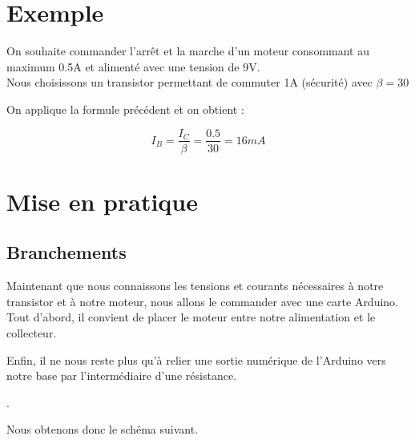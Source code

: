 \section{Exemple}

On souhaite commander l'arrêt et la marche d'un moteur consommant au maximum 0.5A et alimenté avec une tension de 9V. \\
Nous choisissons un transistor permettant de commuter 1A (sécurité) avec $\beta=30$ \\



\begin{reponse}
  On applique la formule précédent et on obtient : 

  $$  I_{B} = \frac{I_{C}}{\beta} = \frac{0.5}{30} = 16 mA $$

  \end{reponse}

 

\section{Mise en pratique}

\subsection{Branchements}

    Maintenant que nous connaissons les tensions et courants nécessaires à notre transistor et à notre moteur, nous allons le commander avec une carte Arduino. \\

    Tout d'abord, il convient de placer le moteur entre notre alimentation et le collecteur.\\
    


    Enfin, il ne nous reste plus qu'à relier une sortie numérique de l'Arduino vers notre base par l'intermédiaire d'une résistance.

    .

    Nous obtenons donc le schéma suivant.


